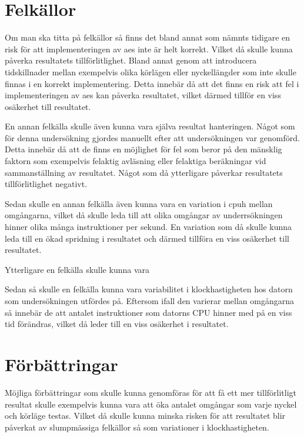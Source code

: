 \section{Felkällor} %
\label{sec:errors}
Om man ska titta på felkällor så finns det bland annat som nämnts tidigare en risk för att implementeringen av \acrshort{aes} inte är helt korrekt. Vilket
då skulle kunna påverka resultatets tillförlitlighet. Bland annat genom att introducera tidskillnader mellan exempelvis olika körlägen eller nyckellängder som inte skulle finnas i en korrekt implementering. Detta innebär
då att det finns en risk att fel i implementeringen av \acrshort{aes} kan påverka resultatet, vilket därmed tillför en viss osäkerhet till resultatet. %

En annan felkälla skulle även kunna vara själva resultat hanteringen. Något som för denna undersökning gjordes manuellt efter att undersökningen var genomförd. Detta innebär då att
de finns en möjlighet för fel som beror på den mänsklig faktorn som exempelvis felaktig avläsning eller felaktiga beräkningar vid sammanställning av resultatet. Något som då ytterligare
påverkar resultatets tillförlitlighet negativt. %

Sedan skulle en annan felkälla även kunna vara en variation i \gls{cpuh} mellan omgångarna, vilket då skulle leda till att olika omgångar av underrsökningen hinner olika många instruktioner
per sekund. En variation som då skulle kunna leda till en ökad spridning i resultatet och därmed tillföra en viss osäkerhet till resultatet.

Ytterligare en felkälla skulle kunna vara 

Sedan så skulle en felkälla kunna vara variabilitet i klockhastigheten hos datorn som undersökningen utfördes på. Eftersom ifall
den varierar mellan omgångarna så innebär de att antalet instruktioner som datorns CPU hinner med på en viss tid förändras, vilket då leder till en viss osäkerhet i resultatet.


\section{Förbättringar} %
\label{sec:improvements}
Möjliga förbättringar som skulle kunna genomföras för att få ett mer tillförlitligt resultat skulle exempelvis kunna vara att öka antalet omgångar som varje nyckel och körläge
testas. Vilket då skulle kunna minska risken för att resultatet blir påverkat av slumpmässiga felkällor så som variationer i klockhastigheten.

